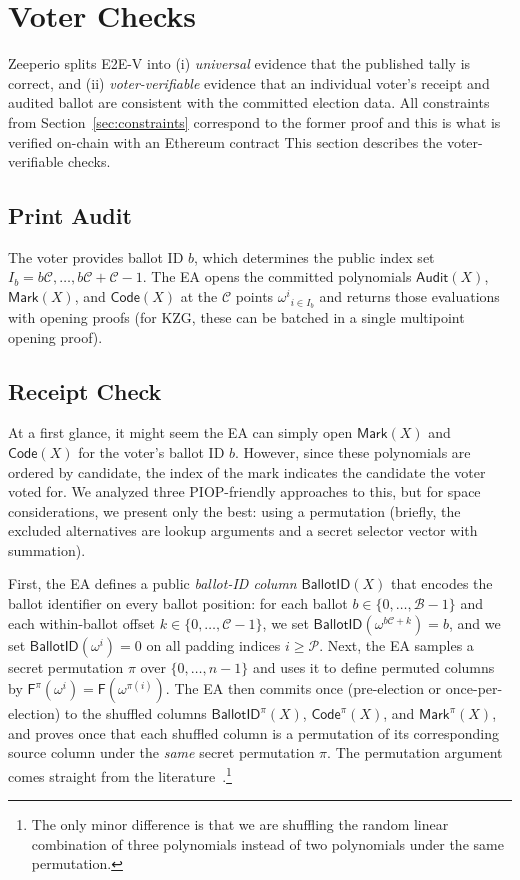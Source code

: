 \section{Voter Checks}
\label{sec:voter}

Zeeperio splits E2E-V into (i) \emph{universal} evidence that the
published tally is correct, and (ii) \emph{voter-verifiable} evidence that an individual voter’s receipt
and audited ballot are consistent with the committed election data.
All constraints from Section~\ref{sec:constraints} correspond to the former proof and this is what is verified on-chain with an Ethereum contract
This section describes the voter-verifiable checks.

\subsection{Print Audit}
\label{sec:print}

The voter provides ballot ID $b$, which determines the public index set $I_b={b\mathcal{C},\ldots,b\mathcal{C}+\mathcal{C}-1}$. The EA opens the committed polynomials $\mathsf{Audit}(X)$, $\mathsf{Mark}(X)$, and $\mathsf{Code}(X)$ at the $\mathcal{C}$ points ${\omega^i}_{i\in I_b}$ and returns those evaluations with opening proofs (for KZG, these can be batched in a single multipoint opening proof). 

\subsection{Receipt Check}
\label{sec:receipt}

At a first glance, it might seem the EA can simply open $\mathsf{Mark}(X)$ and $\mathsf{Code}(X)$ for the voter's ballot ID $b$. However, since these polynomials are ordered by candidate, the index of the mark indicates the candidate the voter voted for. We analyzed three PIOP-friendly approaches to this, but for space considerations, we present only the best: using a permutation (briefly, the excluded alternatives are lookup arguments and a secret selector vector with summation). 

First, the EA defines a public \emph{ballot-ID column} $\mathsf{BallotID}(X)$ that encodes the ballot identifier on every ballot position: for each ballot $b\in\{0,\dots,\mathcal{B}-1\}$ and each within-ballot offset $k\in\{0,\dots,\mathcal{C}-1\}$, we set $\mathsf{BallotID}(\omega^{b\mathcal{C}+k})=b$, and we set $\mathsf{BallotID}(\omega^i)=0$ on all padding indices $i\ge \mathcal{P}$. Next, the EA samples a secret permutation $\pi$ over $\{0,\dots,n-1\}$ and uses it to define permuted columns by $\mathsf{F}^{\pi}(\omega^i)=\mathsf{F}(\omega^{\pi(i)})$. The EA then commits once (pre-election or once-per-election) to the shuffled columns $\mathsf{BallotID}^{\pi}(X)$, $\mathsf{Code}^{\pi}(X)$, and $\mathsf{Mark}^{\pi}(X)$, and proves once that each shuffled column is a permutation of its corresponding source column under the \emph{same} secret permutation $\pi$. The permutation argument comes straight from the literature~\cite{GWC19}.\footnote{The only minor difference is that we are shuffling the random linear combination of three polynomials instead of two polynomials under the same permutation.}

